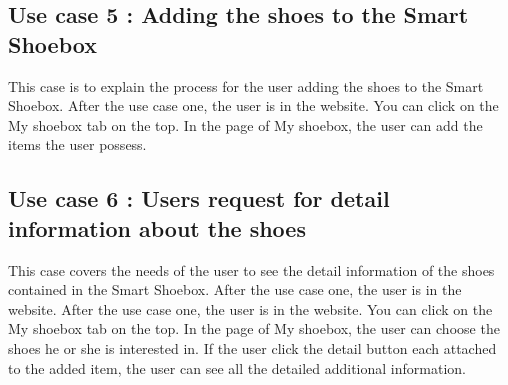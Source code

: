 \documentclass[conference]{IEEEtran}
\begin{document}
\subsection{Use case 5 : Adding the shoes to the Smart Shoebox} This case is to explain the process for the user adding the shoes to the Smart Shoebox. After the use case one, the user is in the website. You can click on the My shoebox tab on the top. In the page of My shoebox, the user can add the items the user possess. 
\subsection{Use case 6 : Users request for detail information about the shoes} This case covers the needs of the user to see the detail information of the shoes contained in the Smart Shoebox. After the use case one, the user is in the website.  After the use case one, the user is in the website. You can click on the My shoebox tab on the top. In the page of My shoebox, the user can choose the shoes he or she is interested in. If the user click the detail button each attached to the added item, the user can see all the detailed additional information.
\end{document}
